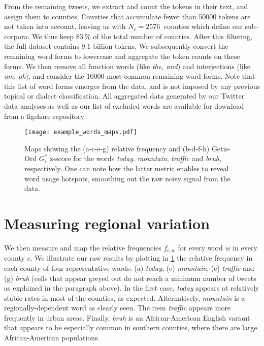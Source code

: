 \documentclass[../thesis.tex]{subfiles}
\begin{document}
From the remaining tweets, we extract and count the tokens in their text, and assign
them to counties. Counties that accumulate fewer than \SI{50000}{} tokens are not taken
into account, leaving us with $N_c = \SI{2576}{}$ counties which define our sub-corpora.
We thus keep $\SI{83}{\percent}$ of the total number of counties. After this filtering,
the full dataset contains $9.1$ billion tokens. We subsequently convert the remaining
word forms to lowercase and aggregate the token counts on these forms. We then remove
all function words (like \textit{the, and}) and interjections (like \textit{um, oh}), and consider the
\SI{10000}{} most common remaining word forms. Note that this list of word forms emerges
from the data, and is not imposed by any previous topical or dialect classification.
All aggregated data generated by our Twitter data analyses as well as our list of
excluded words are available for download from a figshare repository
\cite{LoufWordCounts2023}

\begin{figure}[hpt!]
\centering %
  \texttt{[image: example\_words\_maps.pdf]}
  \caption{Maps showing the (a-c-e-g) relative frequency and (b-d-f-h) Getis-Ord
  $G_i^*$ z-score for the words \textit{today}, \textit{mountain}, \textit{traffic} and
  \textit{bruh}, respectively. One can note how the latter metric enables to reveal word
  usage hotspots, smoothing out the raw noisy signal from the data.}
  \label{fig:example_words_maps}
\end{figure}


\section{Measuring regional variation}
We then measure and map the relative frequencies $f_{c, w}$ for every word $w$ in every
county $c$. We illustrate our raw results by plotting in \cref{fig:example_words_maps}
the relative frequency in each county of four representative words: (a) \textit{today},
(c) \textit{mountain}, (e) \textit{traffic} and (g) \textit{bruh} (cells that appear
greyed out do not reach a minimum number of tweets as explained in the paragraph above).
In the first case, \textit{today} appears at relatively stable rates in most of the
counties, as expected. Alternatively, \textit{mountain} is a regionally-dependent word
as clearly seen. The item \textit{traffic} appears more frequently in urban areas.
Finally, \textit{bruh} is an African-American English variant that appears to be
especially common in southern counties, where there are large African-American
populations.
\end{document}
